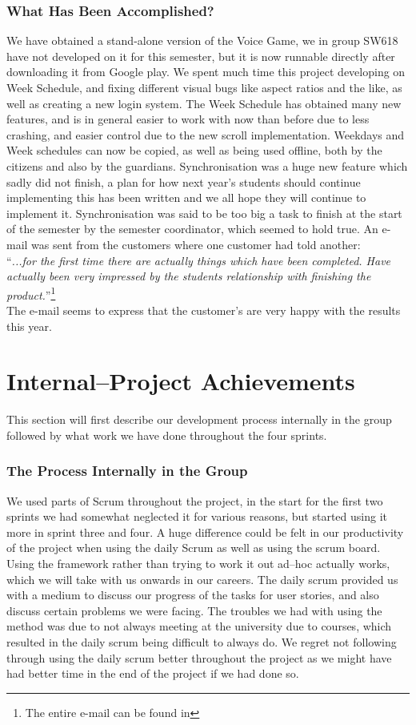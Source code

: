 \subsubsection*{What Has Been Accomplished?}
We have obtained a stand-alone version of the Voice Game, we in group SW618 have not developed on it for this semester, but it is now runnable directly after downloading it from Google play.
We spent much time this project developing on Week Schedule, and fixing different visual bugs like aspect ratios and the like, as well as creating a new login system.
The Week Schedule has obtained many new features, and is in general easier to work with now than before due to less crashing, and easier control due to the new scroll implementation.
Weekdays and Week schedules can now be copied, as well as being used offline, both by the citizens and also by the guardians.
Synchronisation was a huge new feature which sadly did not finish, a plan for how next year's students should continue implementing this has been written and we all hope they will continue to implement it.
Synchronisation was said to be too big a task to finish at the start of the semester by the semester coordinator, which seemed to hold true.
An e-mail was sent from the customers where one customer had told another:\\
\enquote{\textit{...for the first time there are actually things which have been completed. Have actually been very impressed by the students relationship with finishing the product.}}\footnote{The entire e-mail can be found in }
\\
The e-mail seems to express that the customer's are very happy with the results this year.

\section{Internal--Project Achievements}
This section will first describe our development process internally in the group followed by what work we have done throughout the four sprints.

\subsubsection*{The Process Internally in the Group}
We used parts of Scrum throughout the project, in the start for the first two sprints we had somewhat neglected it for various reasons, but started using it more in sprint three and four.
A huge difference could be felt in our productivity of the project when using the daily Scrum as well as using the scrum board.
Using the framework rather than trying to work it out ad--hoc actually works, which we will take with us onwards in our careers.
The daily scrum provided us with a medium to discuss our progress of the tasks for user stories, and also discuss certain problems we were facing.
The troubles we had with using the method was due to not always meeting at the university due to courses, which resulted in the daily scrum being difficult to always do.
We regret not following through using the daily scrum better throughout the project as we might have had better time in the end of the project if we had done so.

